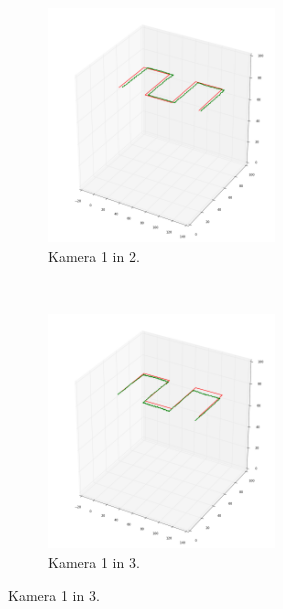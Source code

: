 \documentclass[a4paper, 12pt]{book}
\begin{document}
\begin{figure}
    \centering
    \begin{subfigure}[t]{0.5\textwidth}
        \centering
        \includegraphics[width=6cm]{12.png}
        \caption{Kamera 1 in 2.}
    \end{subfigure}~
    \begin{subfigure}[t]{0.5\textwidth}
        \centering
        \includegraphics[width=6cm]{13.png}
        \caption{Kamera 1 in 3.}
    \end{subfigure}
    

\end{figure}
\end{document}
